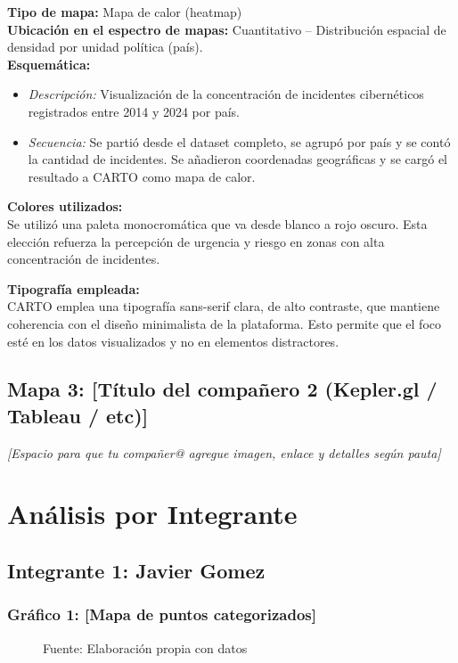\documentclass[12pt, a4paper]{article}
\begin{document}
\textbf{Tipo de mapa:} Mapa de calor (heatmap) \\
\textbf{Ubicación en el espectro de mapas:} Cuantitativo – Distribución espacial de densidad por unidad política (país). \\

\textbf{Esquemática:} \\
\begin{itemize}
    \item \textit{Descripción:} Visualización de la concentración de incidentes cibernéticos registrados entre 2014 y 2024 por país.
    \item \textit{Secuencia:} Se partió desde el dataset completo, se agrupó por país y se contó la cantidad de incidentes. Se añadieron coordenadas geográficas y se cargó el resultado a CARTO como mapa de calor.
\end{itemize}

\textbf{Colores utilizados:} \\
Se utilizó una paleta monocromática que va desde blanco a rojo oscuro. Esta elección refuerza la percepción de urgencia y riesgo en zonas con alta concentración de incidentes.

\textbf{Tipografía empleada:} \\
CARTO emplea una tipografía sans-serif clara, de alto contraste, que mantiene coherencia con el diseño minimalista de la plataforma. Esto permite que el foco esté en los datos visualizados y no en elementos distractores.



\vspace{1em}
\subsection*{Mapa 3: [Título del compañero 2 (Kepler.gl / Tableau / etc)]}
\textit{[Espacio para que tu compañer@ agregue imagen, enlace y detalles según pauta]}


\section*{Análisis por Integrante}

\subsection*{Integrante 1: Javier Gomez}


\subsubsection*{Gráfico 1: [Mapa de puntos categorizados]}
\begin{figure}[H]
    \centering
    \caption{Fuente: Elaboración propia con datos}
\end{figure}
\end{document}
